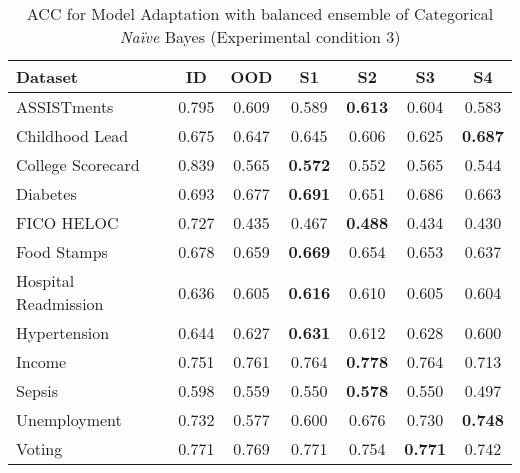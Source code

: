 \begin{table}[h!]
\centering
\caption{ACC for Model Adaptation with balanced ensemble of Categorical \textit{Na\"ive} Bayes (Experimental condition 3)}
\begin{tabular}{lcccccc}
\toprule
{Dataset} & {ID} & {OOD} & {S1} & {S2} & {S3} & {S4} \\
\midrule
ASSISTments & 0.795 & 0.609 & 0.589 & \bfseries 0.613 & 0.604 & 0.583 \\
Childhood Lead & 0.675 & 0.647 & 0.645 & 0.606 & 0.625 & \bfseries 0.687 \\
College Scorecard & 0.839 & 0.565 & \bfseries 0.572 & 0.552 & 0.565 & 0.544 \\
Diabetes & 0.693 & 0.677 & \bfseries 0.691 & 0.651 & 0.686 & 0.663 \\
FICO HELOC & 0.727 & 0.435 & 0.467 & \bfseries 0.488 & 0.434 & 0.430 \\
Food Stamps & 0.678 & 0.659 & \bfseries 0.669 & 0.654 & 0.653 & 0.637 \\
Hospital Readmission & 0.636 & 0.605 & \bfseries 0.616 & 0.610 & 0.605 & 0.604 \\
Hypertension & 0.644 & 0.627 & \bfseries 0.631 & 0.612 & 0.628 & 0.600 \\
Income & 0.751 & 0.761 & 0.764 & \bfseries 0.778 & 0.764 & 0.713 \\
Sepsis & 0.598 & 0.559 & 0.550 & \bfseries 0.578 & 0.550 & 0.497 \\
Unemployment & 0.732 & 0.577 & 0.600 & 0.676 & 0.730 & \bfseries 0.748 \\
Voting & 0.771 & 0.769 & 0.771 & 0.754 & \bfseries 0.771 & 0.742 \\
\bottomrule
\end{tabular}
\end{table}

